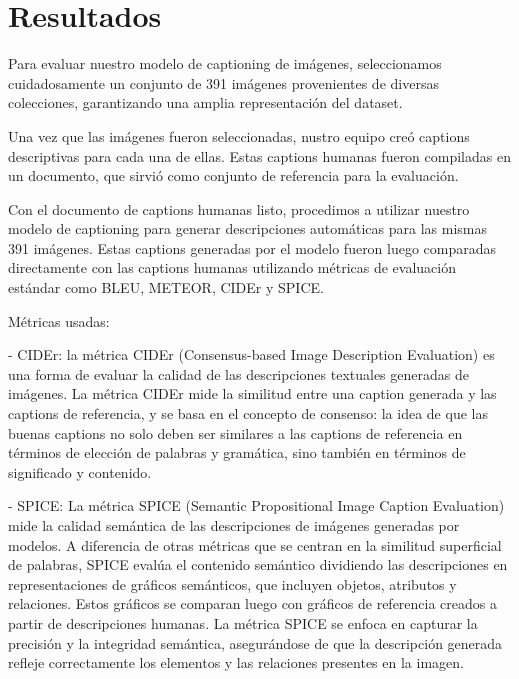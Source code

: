 \chapter{Resultados}\label{chapter:resultados}

Para evaluar nuestro modelo de captioning de imágenes, seleccionamos cuidadosamente un conjunto de 391 imágenes provenientes de diversas colecciones, garantizando una amplia representación del dataset.

Una vez que las imágenes fueron seleccionadas, nustro equipo creó captions descriptivas para cada una de ellas. Estas captions humanas fueron compiladas en un documento, que sirvió como conjunto de referencia para la evaluación.

Con el documento de captions humanas listo, procedimos a utilizar nuestro modelo de captioning para generar descripciones automáticas para las mismas 391 imágenes. Estas captions generadas por el modelo fueron luego comparadas directamente con las captions humanas utilizando métricas de evaluación estándar como BLEU, METEOR, CIDEr y SPICE.

Métricas usadas:

- CIDEr: la métrica CIDEr (Consensus-based Image Description Evaluation) es una forma de evaluar la calidad de las descripciones textuales generadas de imágenes. La métrica CIDEr mide la similitud entre una caption generada y las captions de referencia, y se basa en el concepto de consenso: la idea de que las buenas captions no solo deben ser similares a las captions de referencia en términos de elección de palabras y gramática, sino también en términos de significado y contenido.

- SPICE:
La métrica SPICE (Semantic Propositional Image Caption Evaluation) mide la calidad semántica de las descripciones de imágenes generadas por modelos. A diferencia de otras métricas que se centran en la similitud superficial de palabras, SPICE evalúa el contenido semántico dividiendo las descripciones en representaciones de gráficos semánticos, que incluyen objetos, atributos y relaciones. Estos gráficos se comparan luego con gráficos de referencia creados a partir de descripciones humanas. La métrica SPICE se enfoca en capturar la precisión y la integridad semántica, asegurándose de que la descripción generada refleje correctamente los elementos y las relaciones presentes en la imagen.

